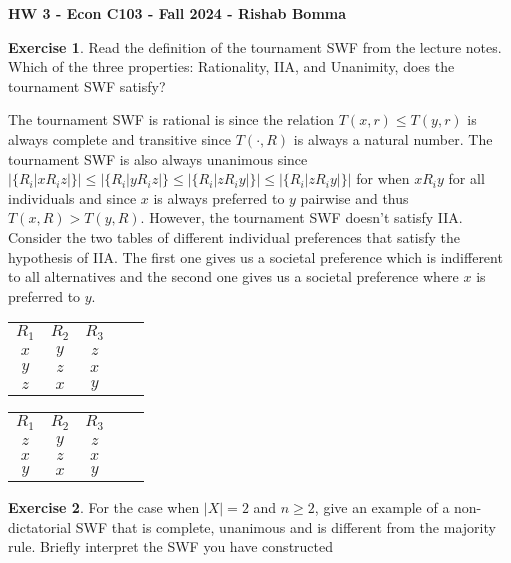 \documentclass[11pt,oneside]{article}
\numberwithin{equation}{section}
\theoremstyle{definition}
\newtheorem{exercise}{Exercise}
\begin{document}
\textbf{HW 3 - Econ C103 - Fall 2024 - Rishab Bomma}

\begin{exercise}
Read the definition of the tournament SWF from the lecture notes. Which of the three properties: Rationality, IIA, and Unanimity, does the tournament SWF satisfy?

\end{exercise}

\begin{solution}

The tournament SWF is rational is since the relation $T(x,r) \leq T(y,r)$ is always complete and transitive since $T(\cdot,R)$ is always a natural number. The tournament SWF is also always unanimous since $|\{R_i | x R_i z|\}| \leq |\{R_i | y R_i z|\} 
 \leq |\{R_i | z R_i y|\}| \leq |\{R_i | z R_i y|\}|$ for when $x R_i y$ for all individuals and since $x$ is always preferred to $y$ pairwise and thus $T(x,R) > T(y,R)$. However, the tournament SWF doesn't satisfy IIA. Consider the two tables of different individual preferences that satisfy the hypothesis of IIA. The first one gives us a societal preference which is indifferent to all alternatives and the second one gives us a societal preference where $x$ is preferred to $y$.
 \begin{center}
\begin{tabular}{ c c c c c}
$R_1$ & $R_2$ & $R_3$  \\
$x$ & $y$ & $z$ \\
$y$ & $z$ & $x$   \\
$z$ & $x$ & $y$   

\end{tabular}
\end{center}

 \begin{center}
\begin{tabular}{ c c c c c}
$R_1$ & $R_2$ & $R_3$  \\
$z$ & $y$ & $z$ \\
$x$ & $z$ & $x$   \\
$y$ & $x$ & $y$   

\end{tabular}
\end{center}
 
 




\end{solution}

\begin{exercise}

For the case when $|X| = 2$ and $n \geq 2$, give an example of a non-dictatorial SWF that is complete, unanimous and is different from the majority rule. Briefly interpret the SWF you have constructed



\end{exercise}
\end{document}
